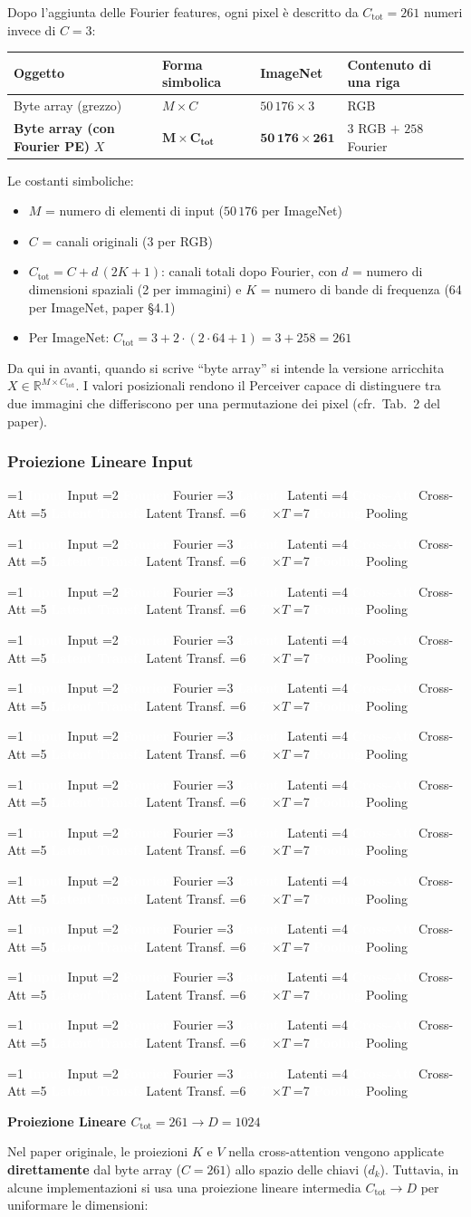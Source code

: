 \documentclass[
  11pt,
]{article}
\newcommand{\pipelinestep}[2]{%
  \ifnum#2=1
    \tikz[baseline=(n.base)]{\node[draw=seccolor, fill=seccolor!15, rounded corners=2pt,
      inner sep=2pt, font=\footnotesize\bfseries] (n) {#1};}%
  \else
    \tikz[baseline=(n.base)]{\node[draw=boxframe, rounded corners=2pt,
      inner sep=2pt, font=\footnotesize] (n) {#1};}%
  \fi
}
\newcommand{\parr}{{\footnotesize\;$\to$\;}}
\newcommand{\pipeline}[1]{%
\begin{tcolorbox}[colback=white, colframe=seccolor!60, boxrule=0.6pt, arc=4pt,
  left=4pt, right=4pt, top=5pt, bottom=5pt, title={\footnotesize\bfseries\color{white} Forward Pass Pipeline}, fonttitle=\footnotesize, coltitle=white, colbacktitle=seccolor!70]
\centering
\pipelinestep{Input}{%
  \ifnum#1=1 1\else 0\fi}%
\parr\pipelinestep{Fourier}{%
  \ifnum#1=2 1\else 0\fi}%
\parr\pipelinestep{Embedding}{%
  \ifnum#1=3 1\else 0\fi}%
\parr\pipelinestep{Latent Array}{%
  \ifnum#1=4 1\else 0\fi}%
\parr\pipelinestep{Cross-Att}{%
  \ifnum#1=5 1\else 0\fi}%
\parr\pipelinestep{Res+MLP}{%
  \ifnum#1=6 1\else 0\fi}%
\\[4pt]
\pipelinestep{Latent Transf.}{%
  \ifnum#1=7 1\else 0\fi}%
\parr\pipelinestep{Res+MLP}{%
  \ifnum#1=8 1\else 0\fi}%
\parr\pipelinestep{$\times T$}{%
  \ifnum#1=9 1\else 0\fi}%
\parr\pipelinestep{Pooling}{%
  \ifnum#1=10 1\else 0\fi}%
\parr\pipelinestep{Classifier}{%
  \ifnum#1=11 1\else 0\fi}%
\parr\pipelinestep{Loss}{%
  \ifnum#1=12 1\else 0\fi}%
\end{tcolorbox}
}
\newcommand{\mystripchip}[3]{%
  \setlength{\fboxsep}{2.8pt}%
  \ifnum#3=#1\relax
    \colorbox{seccolor}{\textcolor{white}{\bfseries #2}}%
  \else
    \colorbox{seccolor!8}{\textcolor{seccolor!55}{#2}}%
  \fi}
\newcommand{\mystriparr}{{\fontsize{8}{8}\selectfont\;\textcolor{seccolor!45}{$\rightarrow$}\;}}
\newcommand{\mystrip}[1]{%
\begin{center}
{\sffamily\fontsize{7.5}{9}\selectfont
\mystripchip{1}{Input}{#1}\mystriparr\mystripchip{2}{Fourier}{#1}\mystriparr\mystripchip{3}{Latenti}{#1}\mystriparr%
\mystripchip{4}{Cross-Att}{#1}\mystriparr\mystripchip{5}{Latent Transf.}{#1}\mystriparr%
\mystripchip{6}{$\times T$}{#1}\mystriparr\mystripchip{7}{Pooling}{#1}}
\end{center}}
\renewcommand{\pipeline}[1]{%
  \ifcase#1\relax
    \mystrip{0}%
    \or\mystrip{1}%
    \or\mystrip{2}%
    \or\mystrip{2}%
    \or\mystrip{3}%
    \or\mystrip{4}%
    \or\mystrip{4}%
    \or\mystrip{5}%
    \or\mystrip{5}%
    \or\mystrip{6}%
    \or\mystrip{7}%
    \or\mystrip{7}%
    \or\mystrip{7}%
  \fi}
\begin{document}
\begin{notabox}[title={\textbf{Checkpoint dimensioni --- fine \S1.4.2}}]
Dopo l'aggiunta delle Fourier features, ogni pixel è descritto da $C_{\text{tot}} = 261$ numeri invece di $C = 3$:

\medskip
\begin{center}
\begin{tabular}{@{}llll@{}}
\toprule
\textbf{Oggetto} & \textbf{Forma simbolica} & \textbf{ImageNet} & \textbf{Contenuto di una riga} \\
\midrule
Byte array (grezzo) & $M \times C$ & $50\,176 \times 3$ & RGB \\
\textbf{Byte array (con Fourier PE)} $X$ & $\boldsymbol{M \times C_{\text{tot}}}$ & $\mathbf{50\,176 \times 261}$ & $3$ RGB $+$ $258$ Fourier \\
\bottomrule
\end{tabular}
\end{center}

\medskip
Le costanti simboliche:
\begin{itemize}\setlength\itemsep{0.1em}
\item $M$ = numero di elementi di input ($50\,176$ per ImageNet)
\item $C$ = canali originali ($3$ per RGB)
\item $C_{\text{tot}} = C + d\,(2K + 1)$: canali totali dopo Fourier, con $d$ = numero di dimensioni spaziali (2 per immagini) e $K$ = numero di bande di frequenza (64 per ImageNet, paper §4.1)
\item Per ImageNet: $C_{\text{tot}} = 3 + 2 \cdot (2 \cdot 64 + 1) = 3 + 258 = 261$
\end{itemize}

\medskip
Da qui in avanti, quando si scrive ``byte array'' si intende la versione arricchita $X \in \mathbb{R}^{M \times C_{\text{tot}}}$. I valori posizionali rendono il Perceiver capace di distinguere tra due immagini che differiscono per una permutazione dei pixel (cfr.\ Tab.\ 2 del paper).
\end{notabox}

\subsubsection{Proiezione Lineare Input}

\pipeline{3}

\textbf{Proiezione Lineare $C_{\text{tot}} = 261 \to D = 1024$}

Nel paper originale, le proiezioni $K$ e $V$ nella cross-attention vengono applicate \textbf{direttamente} dal byte array ($C=261$) allo spazio delle chiavi ($d_k$). Tuttavia, in alcune implementazioni si usa una proiezione lineare intermedia $C_{\text{tot}} \to D$ per uniformare le dimensioni:
\end{document}
